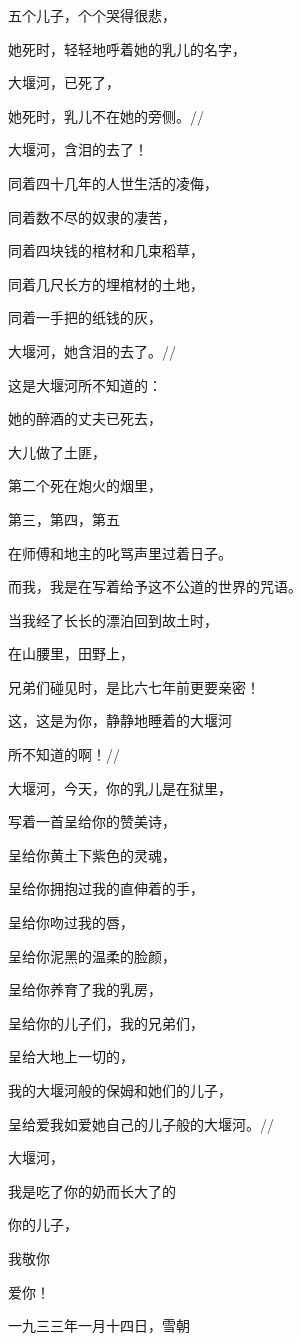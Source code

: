 \documentclass[letterpaper,10pt,english]{sphinxmanual}
\begin{document}
五个儿子，个个哭得很悲，

她死时，轻轻地呼着她的乳儿的名字，

大堰河，已死了，

她死时，乳儿不在她的旁侧。//

大堰河，含泪的去了！

同着四十几年的人世生活的凌侮，

同着数不尽的奴隶的凄苦，

同着四块钱的棺材和几束稻草，

同着几尺长方的埋棺材的土地，

同着一手把的纸钱的灰，

大堰河，她含泪的去了。//

这是大堰河所不知道的：

她的醉酒的丈夫已死去，

大儿做了土匪，

第二个死在炮火的烟里，

第三，第四，第五

在师傅和地主的叱骂声里过着日子。

而我，我是在写着给予这不公道的世界的咒语。

当我经了长长的漂泊回到故土时，

在山腰里，田野上，

兄弟们碰见时，是比六七年前更要亲密！

这，这是为你，静静地睡着的大堰河

所不知道的啊！//

大堰河，今天，你的乳儿是在狱里，

写着一首呈给你的赞美诗，

呈给你黄土下紫色的灵魂，

呈给你拥抱过我的直伸着的手，

呈给你吻过我的唇，

呈给你泥黑的温柔的脸颜，

呈给你养育了我的乳房，

呈给你的儿子们，我的兄弟们，

呈给大地上一切的，

我的大堰河般的保姆和她们的儿子，

呈给爱我如爱她自己的儿子般的大堰河。//

大堰河，

我是吃了你的奶而长大了的

你的儿子，

我敬你

爱你！

一九三三年一月十四日，雪朝
\end{document}
